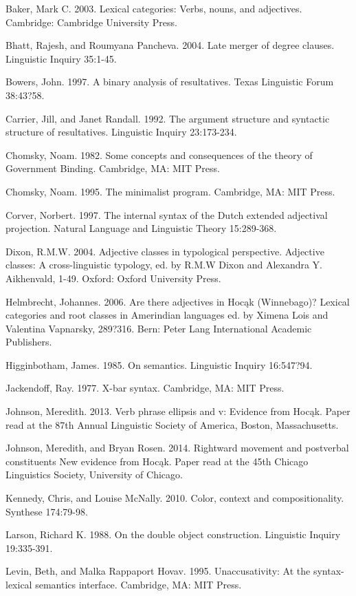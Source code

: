 \documentclass[output=paper]{LSP/langsci}
\begin{document}
\begin{reflist}

Baker, Mark C. 2003. Lexical categories: Verbs, nouns, and adjectives. Cambridge: Cambridge
University Press.

Bhatt, Rajesh, and Roumyana Pancheva. 2004. Late merger of degree clauses. Linguistic Inquiry 35:1-45.

Bowers, John. 1997. A binary analysis of resultatives. Texas Linguistic Forum 38:43?58.

Carrier, Jill, and Janet Randall. 1992. The argument structure and syntactic structure of resultatives. Linguistic Inquiry 23:173-234.

Chomsky, Noam. 1982. Some concepts and consequences of the theory of Government Binding. Cambridge, MA: MIT Press.

Chomsky, Noam. 1995. The minimalist program. Cambridge, MA: MIT Press.

Corver, Norbert. 1997. The internal syntax of the Dutch extended adjectival projection. Natural Language and Linguistic Theory 15:289-368.

Dixon, R.M.W. 2004. Adjective classes in typological perspective. Adjective classes: A cross-linguistic typology, ed. by R.M.W Dixon and Alexandra Y. Aikhenvald, 1-49. Oxford: Oxford University Press.

Helmbrecht, Johannes. 2006. Are there adjectives in Hoc\k{a}k (Winnebago)? Lexical categories and root classes in Amerindian languages ed. by Ximena Lois and Valentina Vapnarsky, 289?316. Bern: Peter Lang International Academic Publishers.

Higginbotham, James. 1985. On semantics. Linguistic Inquiry 16:547?94.

Jackendoff, Ray. 1977. X-bar syntax. Cambridge, MA: MIT Press.

Johnson, Meredith. 2013. Verb phrase ellipsis and v: Evidence from Hoc\k{a}k. Paper read at the 87th Annual Linguistic Society of America, Boston, Massachusetts.

Johnson, Meredith, and Bryan Rosen. 2014. Rightward movement and postverbal constituents New evidence from Hoc\k{a}k. Paper read at the 45th Chicago Linguistics Society, University of Chicago.

Kennedy, Chris, and Louise McNally. 2010. Color, context and compositionality. Synthese 174:79-98.

Larson, Richard K. 1988. On the double object construction. Linguistic Inquiry 19:335-391.

Levin, Beth, and Malka Rappaport Hovav. 1995. Unaccusativity: At the syntax-lexical semantics interface. Cambridge, MA: MIT Press.


\end{reflist}
\end{document}
